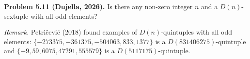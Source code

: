 \textbf{Problem 5.11 (Dujella, 2026).} Is there any non-zero integer $n$ and a $D(n)$-sextuple with all odd elements?

\medskip

\textit{Remark.} Petričević (2018) found examples of $D(n)$-quintuples with all odd elements: $\{-273375,-361375,-504063,833,1377\}$ is a $D(831406275)$-quintuple and $\{-9,59,6075,47291,555579\}$ is a $D(5117175)$-quintuple.
